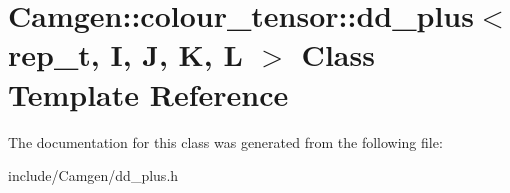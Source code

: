 \hypertarget{a00123}{\section{Camgen\-:\-:colour\-\_\-tensor\-:\-:dd\-\_\-plus$<$ rep\-\_\-t, I, J, K, L $>$ Class Template Reference}
\label{a00123}
}


The documentation for this class was generated from the following file\-:\begin{DoxyCompactItemize}
\item 
include/\-Camgen/dd\-\_\-plus.\-h\end{DoxyCompactItemize}
